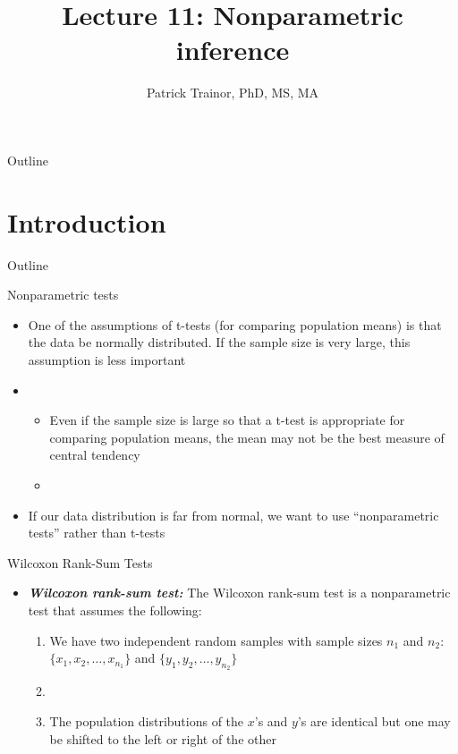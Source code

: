 \documentclass[xcolor=dvipsnames]{beamer}
\title[Lecture 11]{Lecture 11: Nonparametric inference}
\author[Patrick Trainor]{Patrick Trainor, PhD, MS, MA}
\institute[NMSU]{New Mexico State University}
\date{}
\begin{document}
\begin{frame}
\maketitle
\end{frame}

\begin{frame}{Outline}
\tableofcontents[hideallsubsections]
\end{frame}

\section{Introduction}
\begin{frame}{Outline}
\tableofcontents[currentsection,subsectionstyle=show/shaded/hide]
\end{frame}

\begin{frame}{Nonparametric tests}
	\begin{itemize}
		\item One of the assumptions of t-tests (for comparing population means) is that the data be normally distributed. If the sample size is very large, this assumption is less important \pause
		\item[]
		\begin{itemize}
			\item Even if the sample size is large so that a t-test is appropriate for comparing population means, the mean may not be the best measure of central tendency \pause
			\item[]
		\end{itemize}
		\item If our data distribution is far from normal, we want to use ``nonparametric tests'' rather than t-tests 
	\end{itemize}
\end{frame}

\begin{frame}{Wilcoxon Rank-Sum Tests}
	\begin{itemize}
		\item \textbf{\emph{Wilcoxon rank-sum test:}} The Wilcoxon rank-sum test is a nonparametric test that assumes the following:  \pause
		
		\begin{enumerate}
			\item We have two independent random samples with sample sizes $n_1$ and $n_2$: $\{x_1, x_2, \hdots, x_{n_1}\}$ and $\{y_1, y_2, \hdots, y_{n_2}\}$ \pause
			\item[]
			\item The population distributions of the $x$'s and $y$'s are identical but one may be shifted to the left or right of the other
		\end{enumerate}
	\end{itemize}
\end{frame}
\end{document}
